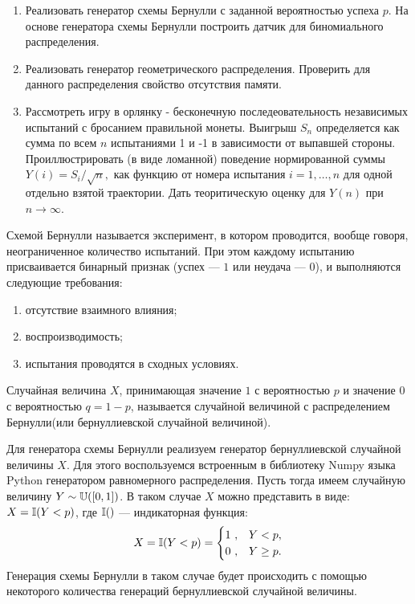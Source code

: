 

\begin{enumerate}
	\item Реализовать генератор схемы Бернулли с заданной вероятностью
     успеха $p$. На основе генератора схемы Бернулли построить датчик
     для биномиального распределения.
	\item Реализовать генератор геометрического распределения. Проверить
     для данного распределения свойство отсутствия памяти.
	\item Рассмотреть игру в орлянку - бесконечную последеовательность
     независимых испытаний с бросанием правильной монеты.
     Выигрыш $S_n$ определяется как сумма по всем $n$ испытаниями 1 и -1
     в зависимости от выпавшей стороны. Проиллюстрировать (в виде ломанной)
     поведение нормированной суммы $Y(i) = S_i / \sqrt{n},$ как функцию
     от номера испытания $i = 1, \dots, n$ для одной отдельно взятой
     траектории. Дать теоритическую оценку для $Y(n)$
     при $n \longrightarrow \infty$.
\end{enumerate}

\begin{definition}
	Схемой Бернулли называется эксперимент, в котором проводится,
     вообще говоря, неограниченное количество испытаний. При этом каждому
     испытанию присваивается бинарный признак (успех --- $1$ или неудача --- $0$), и
     выполняются следующие требования:
	\begin{enumerate}
		\item отсутствие взаимного влияния;
		\item воспроизводимость;
		\item испытания проводятся в сходных условиях.
	\end{enumerate}
\end{definition}

\begin{definition}
	Случайная величина $X$, принимающая значение $1$ с вероятностью
     $p$ и значение $0$ с вероятностью $q = 1 - p$, называется случайной величиной
     с распределением Бернулли(или бернуллиевской случайной величиной).
\end{definition}

Для генератора схемы Бернулли реализуем генератор бернуллиевской случайной
 величины $X$. Для этого воспользуемся встроенным в библиотеку Numpy
 языка Python генератором равномерного распределения. Пусть тогда имеем
 случайную величину $Y \sim \operatorname{\mathbb{U}}([0,1])$. В таком случае $X$
 можно представить в виде: $X = \operatorname{\mathbb{I}}(Y < p)$, где $\operatorname{\mathbb{I}}()$
 --- индикаторная функция:
\begin{equation}
    X = \operatorname{\mathbb{I}}(Y < p) = 
    \begin{cases}
        1 \ , & Y < p, \\
        0 \ , & Y \ge p.
    \end{cases}
\end{equation}
Генерация схемы Бернулли в таком случае будет происходить с помощью некоторого
 количества генераций бернуллиевской случайной величины.

